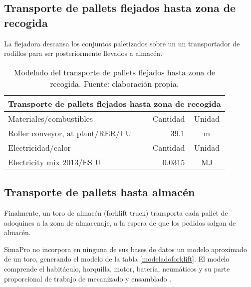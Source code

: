 \subsection{Transporte de pallets flejados hasta zona de recogida}

La flejadora descansa los conjuntos paletizados sobre un un transportador de rodillos para ser posteriormente llevados a almacén.

\begin{table}[!htb]
\centering
\begin{tabular}{p{8cm}rc}
\toprule
\multicolumn{3}{c}{Transporte de pallets flejados hasta zona de recogida}\\
\midrule
Materiales/combustibles & Cantidad & Unidad\\
\midrule
Roller conveyor, at plant/RER/I U & 39.1 & \si{m}\\
\midrule
Electricidad/calor & Cantidad & Unidad\\
\midrule
Electricity mix 2013/ES U & 0.0315 & \si{MJ}\\
\bottomrule
\end{tabular}
\caption[Modelado del transporte de pallets flejados hasta zona de recogida.]{Modelado del transporte de pallets flejados hasta zona de recogida. Fuente: elaboración propia.}
\label{modeladopalletsrecogida}
\end{table}

\subsection{Transporte de pallets hasta almacén}
Finalmente, un toro de almacén (forklift truck) transporta cada pallet de adoquines a la zona de almacenaje, a la espera de que los pedidos salgan de almacén.

SimaPro no incorpora en ninguna de sus bases de datos un modelo aproximado de un toro, generando el modelo de la tabla \ref{modeladoforklift}. El modelo comprende el habitáculo, horquilla, motor, batería, neumáticos y su parte proporcional de trabajo de mecanizado y ensamblado \cite{ecocosts}.

